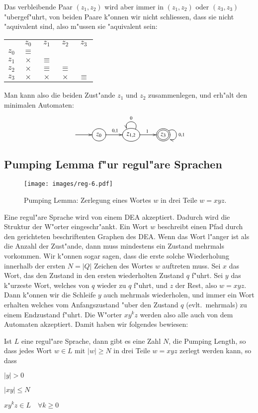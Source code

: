 Das verbleibende Paar $(z_1,z_2)$ wird aber immer in $(z_1,z_2)$ 
oder $(z_3,z_3)$ "ubergef"uhrt, von beiden Paare k"onnen wir nicht
schliessen, dass sie nicht "aquivalent sind, also m"ussen sie "aquivalent
sein:
\begin{center}
\begin{tabular}{ccccc}
     &$z_0$   &$z_1$   &$z_2$   &$z_3$   \\
$z_0$&$\equiv$&        &        &        \\
$z_1$&$\times$&$\equiv$&        &        \\
$z_2$&$\times$&$\equiv$&$\equiv$&        \\
$z_3$&$\times$&$\times$&$\times$&$\equiv$
\end{tabular}
\end{center}
Man kann also die beiden Zust"ande $z_1$ und $z_2$ zusammenlegen,
und erh"alt den minimalen Automaten:
\[
\entrymodifiers={++[o][F]}
\xymatrix{
*+\txt{} \ar[r]
	&{z_0}\ar[r]^{0,1} 
		&{z_{1,2}}\ar@(ur,ul)_{0}\ar[r]^1
			&*++[o][F=]{z_3}\ar@(ur,dr)^{0,1}
}
\]
\subsection{Pumping Lemma f"ur regul"are Sprachen\label{regulaer:pumpinglemma}}
\begin{figure}
\begin{center}
\texttt{[image: images/reg-6.pdf]}
\end{center}
\caption{Pumping Lemma: Zerlegung eines Wortes $w$ in drei Teile
$w=xyz$.\label{regular:pumpinglemma-graph}}
\end{figure}
Eine regul"are Sprache wird von einem DEA akzeptiert. Dadurch wird
die Struktur der W"orter eingeschr"ankt. Ein Wort $w$ beschreibt
einen Pfad durch den gerichteten beschriftenten Graphen des DEA.
Wenn das Wort l"anger ist als die Anzahl der Zust"ande, dann muss
mindestens ein Zustand mehrmals vorkommen. Wir k"onnen sogar
sagen, dass die erste solche Wiederholung innerhalb der ersten
$N = |Q|$ Zeichen des Wortes $w$ auftreten muss. Sei $x$ das Wort,
das den Zustand in den ersten wiederholten Zustand $q$ f"uhrt.
Sei $y$ das k"urzeste Wort, welches von $q$ wieder zu $q$ f"uhrt, und
$z$ der Rest, also $w=xyz$. Dann k"onnen wir die Schleife $y$
auch mehrmals wiederholen, und immer ein Wort erhalten welches
vom Anfangszustand "uber den Zustand $q$ (evlt.~mehrmals) zu einem
Endzustand f"uhrt. Die W"orter $xy^kz$ werden also alle auch von
dem Automaten akzeptiert. Damit haben wir folgendes bewiesen:
\begin{satz}
Ist $L$ eine regul"are Sprache, dann gibt es eine Zahl $N$, die Pumping Length, so dass
jedes Wort $w\in L$ mit $|w|\ge N$ in drei Teile
$w=xyz$ zerlegt werden kann, so dass
\begin{compactenum}
\item $|y| > 0$
\item $|xy|\le N$
\item $xy^kz\in L\quad\forall k\ge 0$
\end{compactenum}
\end{satz}

